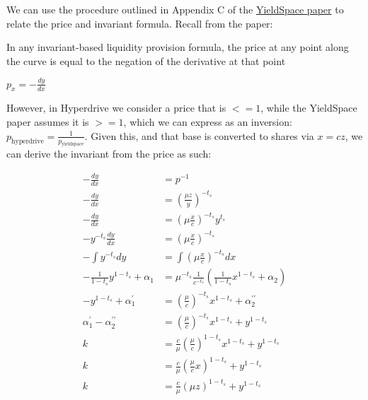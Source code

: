 \begin{callout}

We can use the procedure outlined in Appendix C of the \href{https://yield.is/YieldSpace.pdf}{YieldSpace paper} to relate the price and invariant formula.
Recall from the paper:

\begin{displayquote}
In any invariant-based liquidity provision formula, the price at any point along the curve is equal to the negation of the derivative at that point

$p_{x} = -\tfrac{dy}{dx}$
\end{displayquote}

However, in Hyperdrive we consider a price that is $<=1$, while the YieldSpace paper assumes it is $>=1$, which we can express as an inversion:
$p_{\text{hyperdrive}} = \tfrac{1}{p_{\text{yieldspace}}}$.
Given this, and that base is converted to shares via $x = cz$, we can derive the invariant from the price as such:

\begin{displaymath}
\begin{aligned}
-\tfrac{dy}{dx} &= p^{-1} \\
-\tfrac{dy}{dx} &= \left( \tfrac{\mu z}{y} \right)^{-t_s} \\
-\tfrac{dy}{dx} &= \left( \mu \tfrac{x}{c} \right)^{-t_s} y^{t_{s}} \\
-y^{-t_{s}} \tfrac{dy}{dx} &= \left( \mu \tfrac{x}{c} \right)^{-t_s} \\
-\int{y^{-t_{s}}}{dy} &= \int{\left( \mu \tfrac{x}{c} \right)^{-t_s}}{dx} \\
-\tfrac{1}{1-t_{s}} y^{1 - t_{s}} + \alpha_{1} &= \mu^{-t_{s}} \tfrac{1}{c^{-t_{s}}} \left( \tfrac{1}{1-t_{s}} x^{1-t_{s}} + \alpha_{2} \right) \\
-y^{1 - t_{s}} + \alpha_{1}^{\prime} &= \left( \tfrac{\mu}{c} \right)^{-t_{s}} x^{1-t_{s}} + \alpha_{2}^{\prime\prime} \\
\alpha_{1}^{\prime} - \alpha_{2}^{\prime\prime} &= \left( \tfrac{\mu}{c} \right)^{-t_{s}} x^{1 - t_{s}} + y^{1 - t_{s}} \\
k &= \tfrac{c}{\mu} \left( \tfrac{\mu}{c} \right)^{1 - t_{s}} x^{1 - t_{s}} + y^{1 - t_{s}} \\
k &= \tfrac{c}{\mu} \left( \tfrac{\mu}{c} x \right)^{1 - t_{s}} + y^{1 - t_{s}} \\
k &= \tfrac{c}{\mu} (\mu z)^{1 - t_{s}} + y^{1 - t_{s}} \\
\end{aligned}
\end{displaymath}

\end{callout}

